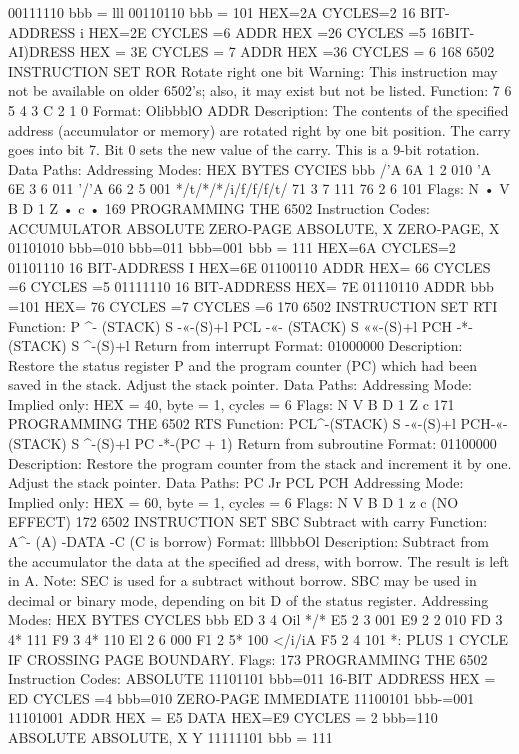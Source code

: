 00111110
bbb = lll
00110110
bbb = 101
HEX=2A CYCLES=2
16 BIT-ADDRESS
i
HEX=2E CYCLES =6
ADDR
HEX =26 CYCLES =5
16BIT-AI)DRESS
HEX = 3E CYCLES = 7
ADDR
HEX =36 CYCLES = 6
168
6502 INSTRUCTION SET
ROR Rotate right one bit
Warning: This instruction may not be available on older 6502's;
also, it may exist but not be listed.
Function:
7 6 5 4 3
C
2 1 0
Format: OlibbblO ADDR
Description:
The contents of the specified address (accumulator or memory)
are rotated right by one bit position. The carry goes into bit 7. Bit 0
sets the new value of the carry. This is a 9-bit rotation.
Data Paths:
Addressing Modes:
HEX
BYTES
CYCIES
bbb
/'A
6A
1
2
010
'A
6E
3
6
011
'/'A
66
2
5
001
*/t/*/*/i/f/f/f/t/
71
3
7
111
76
2
6
101
Flags:
N
•
V B D 1 Z
•
c
•
169
PROGRAMMING THE 6502
Instruction Codes:
ACCUMULATOR
ABSOLUTE
ZERO-PAGE
ABSOLUTE, X
ZERO-PAGE, X
01101010
bbb=010
bbb=011
bbb=001
bbb = 111
HEX=6A CYCLES=2
01101110 16 BIT-ADDRESS
I
HEX=6E
01100110 ADDR
HEX= 66
CYCLES =6
CYCLES =5
01111110 16 BIT-ADDRESS
HEX= 7E
01110110 ADDR
bbb =101 HEX= 76
CYCLES =7
CYCLES =6
170
6502 INSTRUCTION SET
RTI
Function:
P ^- (STACK)
S -«-(S)+l
PCL -«- (STACK)
S ««-(S)+l
PCH -*- (STACK)
S ^-(S)+l
Return from interrupt
Format: 01000000
Description:
Restore the status register P and the program counter (PC)
which had been saved in the stack. Adjust the stack pointer.
Data Paths:
Addressing Mode:
Implied only:
HEX = 40, byte = 1, cycles = 6
Flags:
N V B D 1 Z c
171
PROGRAMMING THE 6502
RTS
Function:
PCL^-(STACK)
S -«-(S)+l
PCH-«- (STACK)
S ^-(S)+l
PC -*-(PC + 1)
Return from subroutine
Format: 01100000
Description:
Restore the program counter from the stack and increment it
by one. Adjust the stack pointer.
Data Paths:
PC Jr PCL
PCH
Addressing Mode:
Implied only:
HEX = 60, byte = 1, cycles = 6
Flags:
N V B D 1 z c
(NO EFFECT)
172
6502 INSTRUCTION SET
SBC Subtract with carry
Function:
A^- (A) -DATA -C (C is borrow)
Format: lllbbbOl
Description:
Subtract from the accumulator the data at the specified ad
dress, with borrow. The result is left in A. Note: SEC is used for a
subtract without borrow.
SBC may be used in decimal or binary mode, depending on bit
D of the status register.
Addressing Modes:
HEX
BYTES
CYCLES
bbb
ED
3
4
Oil
*/*
E5
2
3
001
E9
2
2
010
FD
3
4*
111
F9
3
4*
110
El
2
6
000
F1
2
5*
100
</i/iA
F5
2
4
101
*: PLUS 1 CYCLE IF CROSSING PAGE BOUNDARY.
Flags:
173
PROGRAMMING THE 6502
Instruction Codes:
ABSOLUTE 11101101
bbb=011
16-BIT ADDRESS
HEX = ED CYCLES =4
bbb=010
ZERO-PAGE
IMMEDIATE
11100101
bbb-=001
11101001
ADDR
HEX = E5
DATA
HEX=E9 CYCLES = 2
bbb=110
ABSOLUTE
ABSOLUTE,
X
Y
11111101
bbb = 111
